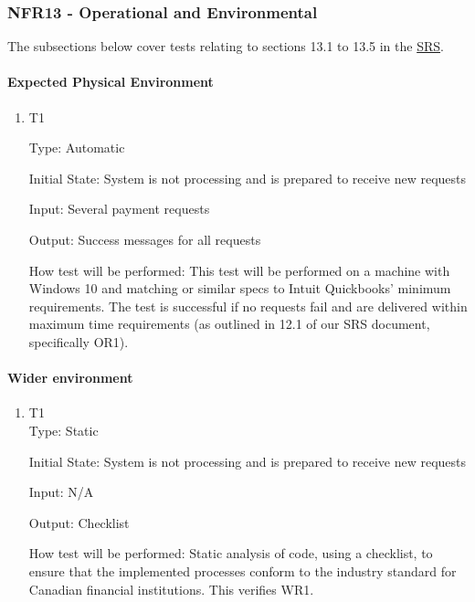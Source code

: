 \documentclass[12pt, titlepage]{article}
\begin{document}
\subsubsection{NFR13 - Operational and Environmental}

The subsections below cover tests relating to sections 13.1 to 13.5 in the \href{https://shorturl.at/FdAgR}{SRS}.

\paragraph{Expected Physical Environment}

\begin{enumerate}

\item{T1\\}
\hypertarget{NFR13.1-TC1}{}
  
Type: Automatic

Initial State: System is not processing and is prepared to receive new requests

Input: Several payment requests

Output: Success messages for all requests

How test will be performed: This test will be performed on a machine with Windows 10 and matching or similar specs to Intuit Quickbooks’ minimum requirements. The test is successful if no requests fail and are delivered within maximum time requirements (as outlined in 12.1 of our SRS document, specifically OR1).
  
\end{enumerate}

\paragraph{Wider environment}

\begin{enumerate}

\item{T1\\}
\hypertarget{NFR13.2-TC1}{}
Type: Static

Initial State: System is not processing and is prepared to receive new requests

Input: N/A

Output: Checklist 

How test will be performed: Static analysis of code, using a checklist, to ensure that the implemented processes conform to the industry standard for Canadian financial institutions. This verifies WR1.
  
\end{enumerate}
\end{document}
